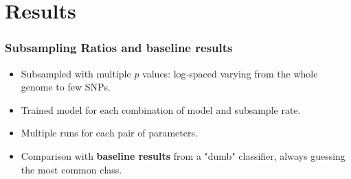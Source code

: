 \documentclass[aspectratio=169]{beamer}
\begin{document}
\section{Results}
\begin{frame}
\frametitle{Subsampling Ratios and baseline results}
\begin{itemize}
    \item Subsampled with multiple $p$ values: log-spaced varying from the whole genome to few SNPs.
  \item Trained model for each combination of model and subsample rate.
  \item Multiple runs for each pair of parameters.
  \item Comparison with \textbf{baseline results} from a "dumb" classifier, always guessing the most common class.
\end{itemize}

\centering
{}
\end{frame}
\end{document}
